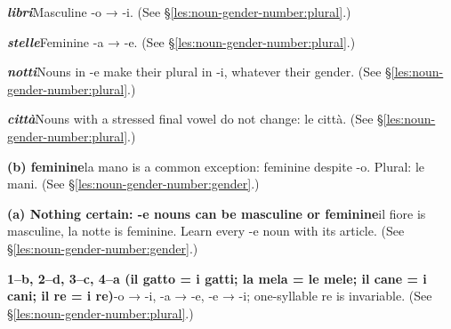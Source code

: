 \documentclass[11pt,a4paper,twoside,openright]{book}
\newcommand{\answerheading}[1]{\par\medskip\noindent{\sffamily\bfseries\small #1}\par\nopagebreak}
\begin{document}
\answerheading{\S\ref{les:noun-gender-number} Noun gender and number}\label{ans:noun-gender-number}
\begin{answers}
\item\relax \textbf{\textit{libri}}\newline Masculine -o → -i. {\color{muted}(See \S\ref{les:noun-gender-number:plural}.)}
\item\relax \textbf{\textit{stelle}}\newline Feminine -a → -e. {\color{muted}(See \S\ref{les:noun-gender-number:plural}.)}
\item\relax \textbf{\textit{notti}}\newline Nouns in -e make their plural in -i, whatever their gender. {\color{muted}(See \S\ref{les:noun-gender-number:plural}.)}
\item\relax \textbf{\textit{città}}\newline Nouns with a stressed final vowel do not change: le città. {\color{muted}(See \S\ref{les:noun-gender-number:plural}.)}
\item\relax \textbf{(b) feminine}\newline la mano is a common exception: feminine despite -o. Plural: le mani. {\color{muted}(See \S\ref{les:noun-gender-number:gender}.)}
\item\relax \textbf{(a) Nothing certain: -e nouns can be masculine or feminine}\newline il fiore is masculine, la notte is feminine. Learn every -e noun with its article. {\color{muted}(See \S\ref{les:noun-gender-number:gender}.)}
\item\relax \textbf{1--b, 2--d, 3--c, 4--a {\color{muted}(il gatto = i gatti; la mela = le mele; il cane = i cani; il re = i re)}}\newline -o → -i, -a → -e, -e → -i; one-syllable re is invariable. {\color{muted}(See \S\ref{les:noun-gender-number:plural}.)}
\end{answers}
\end{document}
